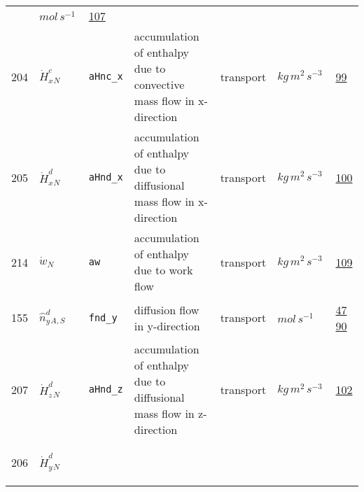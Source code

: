 \begin{longtable}{|p{1cm}|p{2.5cm}|p{4.5cm}|p{8cm}|p{3.0cm}|p{3cm}|p{1cm}|}
             & $ mol \,s^{-1} \, $
             &                 \hyperlink{"e:107"}{ 107 }
                 \\
            204
             & \hypertarget{"v:204"}{ $ {{\dot{H}^c_x}}{_{N}} $}
             & \verb|aHnc_x|
             & accumulation of enthalpy due to convective mass flow in x-direction
             & \begin{lay}transport \end{lay}
             & $ kg \,m^{2} \,s^{-3} \, $
             &                 \hyperlink{"e:99"}{ 99 }
                 \\
            205
             & \hypertarget{"v:205"}{ $ {{\dot{H}^d_x}}{_{N}} $}
             & \verb|aHnd_x|
             & accumulation of enthalpy due to diffusional mass flow in x-direction
             & \begin{lay}transport \end{lay}
             & $ kg \,m^{2} \,s^{-3} \, $
             &                 \hyperlink{"e:100"}{ 100 }
                 \\
            214
             & \hypertarget{"v:214"}{ $ {{\dot{w}}}{_{N}} $}
             & \verb|aw|
             & accumulation of enthalpy due to work flow
             & \begin{lay}transport \end{lay}
             & $ kg \,m^{2} \,s^{-3} \, $
             &                 \hyperlink{"e:109"}{ 109 }
                 \\
            155
             & \hypertarget{"v:155"}{ $ {{\hat{n}^{d}_y}}{_{A, S}} $}
             & \verb|fnd_y|
             & diffusion flow in y-direction
             & \begin{lay}transport \end{lay}
             & $ mol \,s^{-1} \, $
             &                 \hyperlink{"e:47"}{ 47 }
                                 \hyperlink{"e:90"}{ 90 }
                 \\
            207
             & \hypertarget{"v:207"}{ $ {{\dot{H}^d_z}}{_{N}} $}
             & \verb|aHnd_z|
             & accumulation of enthalpy due to diffusional mass flow in z-direction
             & \begin{lay}transport \end{lay}
             & $ kg \,m^{2} \,s^{-3} \, $
             &                 \hyperlink{"e:102"}{ 102 }
                 \\
            206
             & \hypertarget{"v:206"}{ $ {{\dot{H}^d_y}}{_{N}} $}

\end{longtable}
